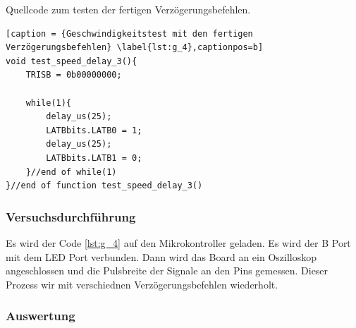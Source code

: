\documentclass[12pt,a4paper]{article}
\begin{document}
Quellcode zum testen der fertigen Verzögerungsbefehlen.

\lstset{language=C, basicstyle=\tiny}
\begin{lstlisting}[caption = {Geschwindigkeitstest mit den fertigen Verzögerungsbefehlen} \label{lst:g_4},captionpos=b]
void test_speed_delay_3(){
	TRISB = 0b00000000;
	
	while(1){
		delay_us(25);
		LATBbits.LATB0 = 1;
		delay_us(25);
		LATBbits.LATB1 = 0;
	}//end of while(1)
}//end of function test_speed_delay_3()
\end{lstlisting}



\subsubsection*{Versuchsdurchführung}

Es wird der Code \ref{lst:g_4} auf den Mikrokontroller geladen. Es wird der B Port mit dem LED Port verbunden. Dann wird das Board an ein Oszilloskop angeschlossen und die Pulsbreite der Signale an den Pins gemessen. Dieser Prozess wir mit verschiednen Verzögerungsbefehlen wiederholt.


\subsubsection*{Auswertung}
\end{document}
